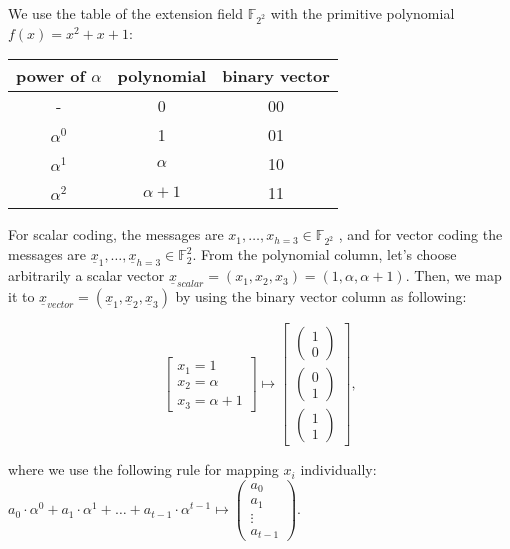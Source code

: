 \begin{example}
We use the table of the extension field $\ensuremath{\mathbb{F}}_{2^{2}}$
with the primitive polynomial $f(x)=x^{2}+x+1$:
\end{example}
\begin{tabular}{|c|c|c|}
\hline 
power of $\alpha$ & polynomial & binary vector\tabularnewline
\hline 
- & 0 & 00\tabularnewline
\hline 
$\alpha^{0}$ & 1 & 01\tabularnewline
\hline 
$\alpha^{1}$ & $\alpha$ & 10\tabularnewline
\hline 
$\alpha^{2}$ & $\alpha+1$ & 11\tabularnewline
\hline 
\end{tabular}

For scalar coding, the messages are $x_{1},\ldots,x_{h=3}\in\ensuremath{\mathbb{F}}_{2^{2}}$
, and for vector coding the messages are $\underline{x}_{1},\ldots,\underline{x}_{h=3}\in\ensuremath{\mathbb{F}}_{2}^{2}$.
From the polynomial column, let's choose arbitrarily a scalar vector
$\underline{x}_{scalar}=(x_{1},x_{2},x_{3})=(1,\alpha,\alpha+1)$.
Then, we map it to $\underline{x}_{vector}=(\underline{x}_{1},\underline{x}_{2},\underline{x}_{3})$
by using the binary vector column as following:

\[
\left[\begin{array}{c}
x_{1}=1\\
x_{2}=\alpha\\
x_{3}=\alpha+1
\end{array}\right]\mapsto\left[\begin{array}{c}
\left(\begin{array}{c}
1\\
0
\end{array}\right)\\
\left(\begin{array}{c}
0\\
1
\end{array}\right)\\
\left(\begin{array}{c}
1\\
1
\end{array}\right)
\end{array}\right],
\]

where we use the following rule for mapping $x_{i}$ individually:
$a_{0}\cdot\alpha^{0}+a_{1}\cdot\alpha^{1}+\ldots+a_{t-1}\cdot\alpha^{t-1}\mapsto\left(\begin{array}{c}
a_{0}\\
a_{1}\\
\vdots\\
a_{t-1}
\end{array}\right)$.

